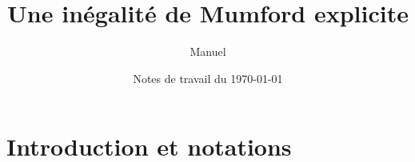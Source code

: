 

\newtheorem{thm}{Théorème} \newtheorem{prop}[thm]{Proposition} \newtheorem{lem}[thm]{Lemme} \newtheorem{coro}[thm]{Corollaire}


\newcommand{\av}[2][v]{\left\lvert#2\right\rvert_{#1}} 		%
\newcommand{\nv}[2][v]{\left\lVert#2\right\rVert_{#1}} 		%
\newcommand{\nnv}[2][v]{\left\lvert\hspace{-1pt}\left\lvert\hspace{-1pt}\left\lvert#2\right\rvert\hspace{-1pt}\right\rvert\hspace{-1pt}\right\rvert_{#1}}
\newcommand{\nvp}[2][v]{\|#2\|_{#1}} 				%
\newcommand{\dv}{{\delta_v}} 					%
\newcommand{\Dv}{\mathrm{dist}_v} 				%
\newcommand{\A}{\mathcal{A}} 					%
\newcommand{\p}[1]{{\boldsymbol{#1}}} 				%
\newcommand{\OA}{\p{0}} 					%
\newcommand{\coa}{\theta} 					%
\newcommand{\BA}{\mathfrak{B}} 					%
\newcommand{\hn}{\hat{h}} 					%
\newcommand{\lgr}[1]{{|#1|}} 					%
\newcommand{\vlg}[1]{\lgr #1} 					%



\author{Manuel }
\title{Une inégalité de Mumford explicite}
\date{Notes de travail du \today}



\maketitle

\section*{Introduction et notations}

